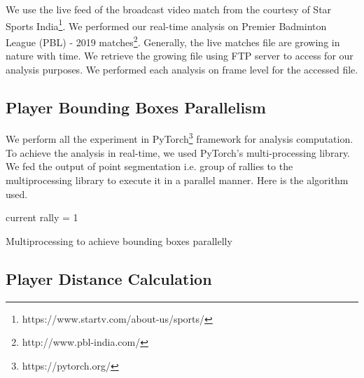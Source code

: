 \documentclass[runningheads,a4paper]{llncs}
\begin{document}
We use the live feed of the broadcast video match from the courtesy of Star Sports India\footnote{https://www.startv.com/about-us/sports/}. We performed our real-time analysis on Premier Badminton League (PBL) - 2019 matches\footnote{http://www.pbl-india.com/}. Generally, the live matches file are growing in nature with time. We retrieve the growing file using FTP server to access for our analysis purposes. We performed each analysis on frame level for the accessed file.
\subsection{Player Bounding Boxes Parallelism}

We perform all the experiment in PyTorch\footnote{https://pytorch.org/} framework for analysis computation. To achieve the analysis in real-time, we used PyTorch's multi-processing library. We fed the output of point segmentation i.e. group of rallies to the multiprocessing library to execute it in a parallel manner. Here is the algorithm used.\\

\begin{algorithm}[H]
\SetAlgoLined
{}
 current rally = 1\;
 \caption{Multiprocessing to achieve bounding boxes parallelly}
\end{algorithm}

\subsection{Player Distance Calculation}
\end{document}

